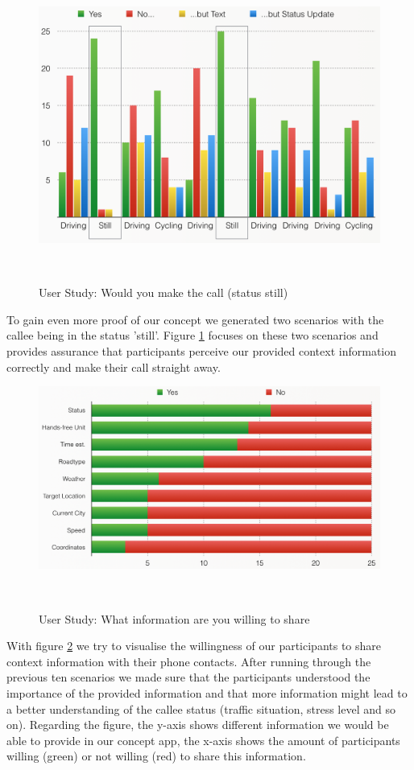 \documentclass{sigchi}
\begin{document}
\begin{figure}[H]
\centering
  \includegraphics[width=0.9\columnwidth]{figures/WouldYouCall_3}
  \caption{User Study: Would you make the call (status still)}~\label{fig:WouldYouCall_3}
\end{figure}

To gain even more proof of our concept we generated two scenarios with the callee being in the status 'still'. Figure \ref{fig:WouldYouCall_3} focuses on these two scenarios and provides assurance that participants perceive our provided context information correctly and make their call straight away.

\begin{figure}[H]
\centering
  \includegraphics[width=0.9\columnwidth]{figures/WhatAreYouWillingToShare}
  \caption{User Study: What information are you willing to share}~\label{fig:WhatAreYouWillingToShare}
\end{figure}

With figure \ref{fig:WhatAreYouWillingToShare} we try to visualise the willingness of our participants to share context information with their phone contacts. After running through the previous ten scenarios we made sure that the participants understood the importance of the provided information and that more information might lead to a better understanding of the callee status (traffic situation, stress level and so on). Regarding the figure, the y-axis shows different information we would be able to provide in our concept app, the x-axis shows the amount of participants willing (green) or not willing (red) to share this information.
\end{document}
